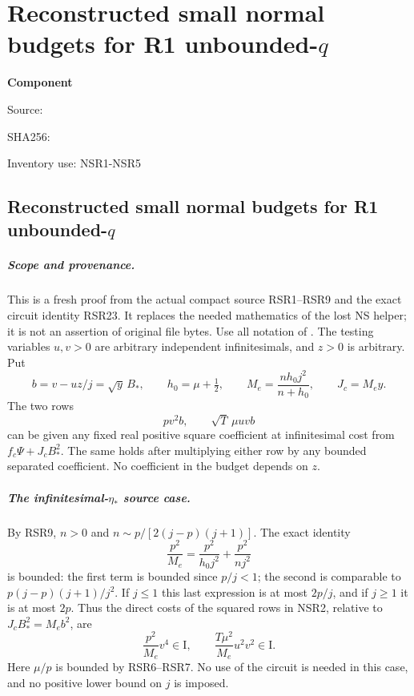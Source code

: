 \chapter{Reconstructed small normal budgets for R1 unbounded-$q$}
\label{component:p4b75bfe0436c}
\noindent\textbf{Component }\par
{\small\noindent Source: \par}
{\small\noindent SHA256: \par}
{\small\noindent Inventory use: NSR1-NSR5\par}
\medskip
\section{Reconstructed small normal budgets for R1 unbounded-$q$}
\label{p4b75bfe0436c:sec:reconstructed-r1-qo-small-normal-budgets}

\paragraph{Scope and provenance.}
This is a fresh proof from the actual compact source RSR1--RSR9 and
the exact circuit identity RSR23. It replaces the needed mathematics
of the lost NS helper; it is not an assertion of original file bytes.
Use all notation of .
The testing variables $u,v>0$ are arbitrary independent infinitesimals,
and $z>0$ is arbitrary. Put
\[
 b=v-uz/j=\sqrt y\,B_*,\qquad
 h_0=\mu+\tfrac12,\qquad
 M_e=\frac{nh_0j^2}{n+h_0},\qquad J_c=M_ey.
 \tag{NSR1}
\]
The two rows
\[
       p v^2b,\qquad \sqrt T\,\mu u v b
 \tag{NSR2}
\]
can be given any fixed real positive square coefficient at
infinitesimal cost from $f_c\Psi+J_cB_*^2$. The same holds after
multiplying either row by any bounded separated coefficient.
No coefficient in the budget depends on $z$.

\paragraph{The infinitesimal-$\eta_*$ source case.}
By RSR9, $n>0$ and
$n\sim p/[2(j-p)(j+1)]$. The exact identity
\[
 \frac{p^2}{M_e}
 =\frac{p^2}{h_0j^2}+\frac{p^2}{nj^2}
 \tag{NSR3}
\]
is bounded: the first term is bounded since $p/j<1$; the second
is comparable to $p(j-p)(j+1)/j^2$. If $j\leq1$ this last expression
is at most $2p/j$, and if $j\geq1$ it is at most $2p$.
Thus the direct costs of the squared rows in NSR2, relative to
$J_cB_*^2=M_eb^2$, are
\[
 \frac{p^2}{M_e}v^4\in\mathrm I,\qquad
 \frac{T\mu^2}{M_e}u^2v^2\in\mathrm I.
 \tag{NSR4}
\]
Here $\mu/p$ is bounded by RSR6--RSR7. No use of the circuit is
needed in this case, and no positive lower bound on $j$ is imposed.

